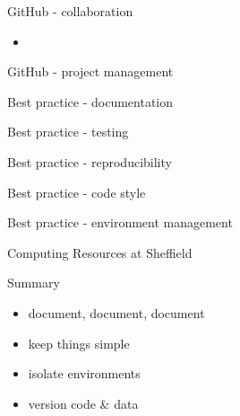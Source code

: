 \documentclass{beamer} %
\begin{document}
  \begin{frame}{GitHub - collaboration}
    \begin{itemize}
      \item 
    \end{itemize}
  \end{frame}

  \begin{frame}{GitHub - project management}
  \end{frame}

  \begin{frame}{Best practice - documentation}
  \end{frame}

  \begin{frame}{Best practice - testing}
  \end{frame}

  \begin{frame}{Best practice - reproducibility}
  \end{frame}

  \begin{frame}{Best practice - code style}
  \end{frame}

  \begin{frame}{Best practice - environment management}
  \end{frame}

  \begin{frame}{Computing Resources at Sheffield}
  \end{frame}

  \begin{frame}{Summary}
    \begin{itemize}
      \item document, document, document
      \item keep things simple
      \item isolate environments
      \item version code \& data
    \end{itemize}
  \end{frame}
\end{document}
